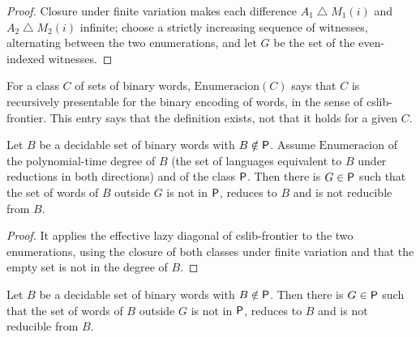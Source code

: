 \begin{proof}
  \leanok
  Closure under finite variation makes each difference $A_1 \mathbin{\triangle} M_1(i)$ and $A_2
  \mathbin{\triangle} M_2(i)$ infinite; choose a strictly increasing sequence of witnesses, alternating
  between the two enumerations, and let $G$ be the set of the even-indexed witnesses.
\end{proof}

\begin{definition}
  \label{def:structure-enumeracion}
  \leanok
  For a class $C$ of sets of binary words, $\mathrm{Enumeracion}(C)$ says that $C$ is recursively
  presentable for the binary encoding of words, in the sense of cslib-frontier. This entry says that
  the definition exists, not that it holds for a given $C$.
  \own{}
\end{definition}

\begin{theorem}
  \label{thm:structure-ladner-enumeraciones}
  \leanok
  Let $B$ be a decidable set of binary words with $B \notin \mathsf{P}$. Assume $\mathrm{Enumeracion}$ of the
  polynomial-time degree of $B$ (the set of languages equivalent to $B$ under reductions in both
  directions) and of the class $\mathsf{P}$. Then there is $G \in \mathsf{P}$ such that the set of words of $B$
  outside $G$ is not in $\mathsf{P}$, reduces to $B$ and is not reducible from $B$.
  \own{}
\end{theorem}

\begin{proof}
  \leanok
  It applies the effective lazy diagonal of cslib-frontier to the two enumerations, using the closure of
  both classes under finite variation and that the empty set is not in the degree of $B$.
\end{proof}

\begin{theorem}
  \label{thm:structure-ladner-universal}
  \leanok
  Let $B$ be a decidable set of binary words with $B \notin \mathsf{P}$. Then there is $G \in \mathsf{P}$ such that the
  set of words of $B$ outside $G$ is not in $\mathsf{P}$, reduces to $B$ and is not reducible from $B$.
\end{theorem}

